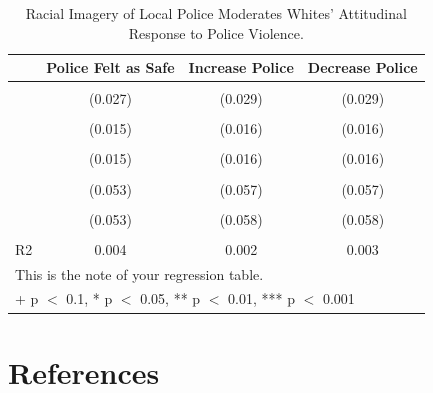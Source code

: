 \documentclass[
  11pt,
]{article}
\begin{document}
\hypertarget{tbl-racial.component}{}
\begin{table}
\caption{\label{tbl-racial.component}Racial Imagery of Local Police Moderates Whites' Attitudinal Response to
Police Violence. }\tabularnewline

\centering
\begin{tabular}[t]{lccc}
\toprule
  & Police Felt as Safe & Increase Police & Decrease Police\\
\midrule
\cellcolor{gray!6}{White Imagery of Police} & \cellcolor{gray!6}{0.007} & \cellcolor{gray!6}{-0.013} & \cellcolor{gray!6}{-0.010}\\
 & (0.027) & (0.029) & (0.029)\\
\cellcolor{gray!6}{PV Whites} & \cellcolor{gray!6}{-0.065***} & \cellcolor{gray!6}{-0.039*} & \cellcolor{gray!6}{0.056***}\\
 & (0.015) & (0.016) & \vphantom{1} (0.016)\\
\cellcolor{gray!6}{PV POC} & \cellcolor{gray!6}{-0.076***} & \cellcolor{gray!6}{-0.077***} & \cellcolor{gray!6}{0.093***}\\
 & (0.015) & (0.016) & (0.016)\\
\cellcolor{gray!6}{White Imagery × PV Whites} & \cellcolor{gray!6}{0.098+} & \cellcolor{gray!6}{-0.003} & \cellcolor{gray!6}{-0.075}\\
 & (0.053) & (0.057) & (0.057)\\
\cellcolor{gray!6}{White Imagery × PV POC} & \cellcolor{gray!6}{0.164**} & \cellcolor{gray!6}{0.162**} & \cellcolor{gray!6}{-0.210***}\\
 & (0.053) & (0.058) & (0.058)\\
\midrule
\cellcolor{gray!6}{Num.Obs.} & \cellcolor{gray!6}{26016} & \cellcolor{gray!6}{26039} & \cellcolor{gray!6}{26036}\\
R2 & 0.004 & 0.002 & 0.003\\
\bottomrule
\multicolumn{4}{l}{\rule{0pt}{1em}This is the note of your regression table.}\\
\multicolumn{4}{l}{\rule{0pt}{1em}+ p $<$ 0.1, * p $<$ 0.05, ** p $<$ 0.01, *** p $<$ 0.001}\\
\end{tabular}
\end{table}

\hypertarget{references}{%
\section*{References}\label{references}}
\end{document}
